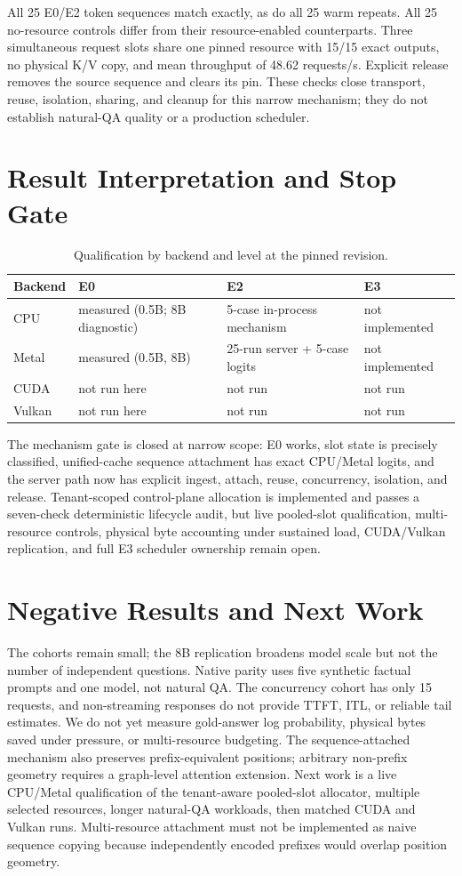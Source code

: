 \documentclass[10pt]{article}
\begin{document}
All 25 E0/E2 token sequences match exactly, as do all 25 warm repeats. All 25
no-resource controls differ from their resource-enabled counterparts. Three
simultaneous request slots share one pinned resource with 15/15 exact outputs,
no physical K/V copy, and mean throughput of 48.62 requests/s. Explicit release
removes the source sequence and clears its pin. These checks close transport,
reuse, isolation, sharing, and cleanup for this narrow mechanism; they do not
establish natural-QA quality or a production scheduler.

\section{Result Interpretation and Stop Gate}
\begin{table}[h]
\centering\small
\caption{Qualification by backend and level at the pinned revision.}
\begin{tabular}{llll}
\toprule Backend & E0 & E2 & E3\\
\midrule
CPU & measured (0.5B; 8B diagnostic) & 5-case in-process mechanism & not implemented\\
Metal & measured (0.5B, 8B) & 25-run server + 5-case logits & not implemented\\
CUDA & not run here & not run & not run\\
Vulkan & not run here & not run & not run\\
\bottomrule
\end{tabular}
\end{table}

The mechanism gate is closed at narrow scope: E0 works, slot state is precisely
classified, unified-cache sequence attachment has exact CPU/Metal logits, and
the server path now has explicit ingest, attach, reuse, concurrency, isolation,
and release. Tenant-scoped control-plane allocation is implemented and passes a
seven-check deterministic lifecycle audit, but live pooled-slot qualification,
multi-resource controls, physical byte accounting under sustained load,
CUDA/Vulkan replication, and full E3 scheduler ownership remain open.

\section{Negative Results and Next Work}
The cohorts remain small; the 8B replication broadens model scale but not the
number of independent questions. Native parity uses five synthetic factual
prompts and one model, not natural QA. The concurrency cohort has only 15
requests, and non-streaming responses do not provide TTFT, ITL, or reliable
tail estimates. We do not yet measure gold-answer log probability, physical
bytes saved under pressure, or multi-resource budgeting. The sequence-attached
mechanism also preserves prefix-equivalent positions; arbitrary non-prefix
geometry requires a graph-level attention extension. Next work is a
live CPU/Metal qualification of the tenant-aware pooled-slot allocator,
multiple selected resources, longer natural-QA workloads, then matched CUDA
and Vulkan runs. Multi-resource attachment must not be implemented as naive
sequence copying because independently encoded prefixes would overlap position
geometry.
\end{document}
